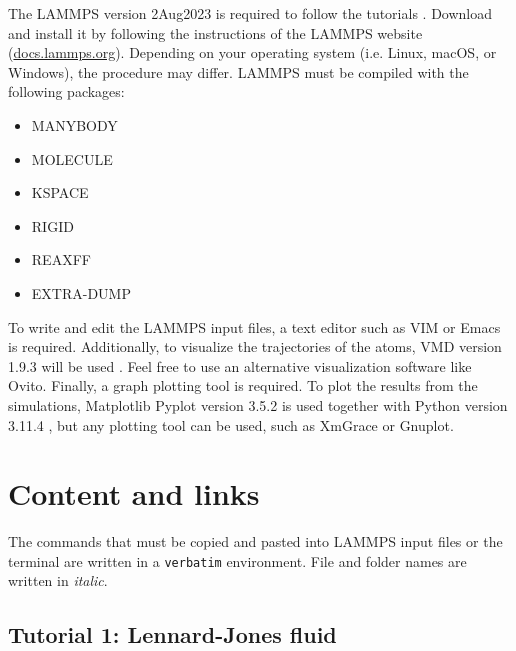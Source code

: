 \documentclass[9pt,tutorial]{livecoms}
\begin{document}
The LAMMPS version 2Aug2023 is required to follow the tutorials \cite{thompson2022lammps}. Download and install it by following the instructions of the LAMMPS website (\href{https://docs.lammps.org}{docs.lammps.org}). Depending on your operating system (i.e. Linux, macOS, or Windows), the procedure may differ. LAMMPS must be compiled with the following packages:
\begin{itemize}
\item MANYBODY
\item MOLECULE
\item KSPACE
\item RIGID
\item REAXFF
\item EXTRA-DUMP
\end{itemize}
To write and edit the LAMMPS input files, a text editor such as VIM or Emacs is required. Additionally, to visualize the trajectories of the atoms, VMD version 1.9.3 will be used \cite{humphrey1996vmd}. Feel free to use an alternative visualization software like Ovito. Finally, a graph plotting tool is required. To plot the results from the simulations, Matplotlib Pyplot version 3.5.2 is used together with Python version 3.11.4 \cite{van1995python, hunter2007Matplotlib}, but any plotting tool can be used, such as XmGrace or Gnuplot. 

\section{Content and links}


The commands that must be copied and pasted into LAMMPS input files or the terminal are written in a  \verb+verbatim+ environment. File and folder names are written in \textit{italic}.

\subsection{Tutorial 1: Lennard-Jones fluid}
\label{lennard-jones-label}
\end{document}
